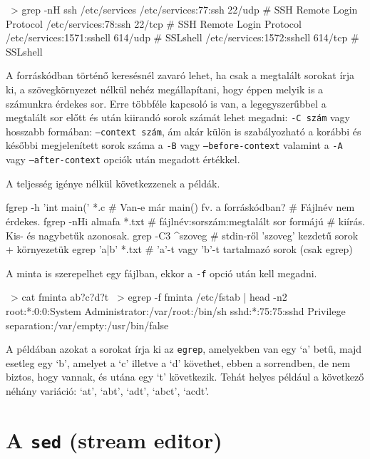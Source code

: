 \begin{VerbExample}
~>  grep -nH ssh /etc/services
/etc/services:77:ssh              22/udp     # SSH Remote Login Protocol
/etc/services:78:ssh              22/tcp     # SSH Remote Login Protocol
/etc/services:1571:sshell       614/udp     # SSLshell
/etc/services:1572:sshell               614/tcp     # SSLshell
\end{VerbExample}

A forráskódban történő keresésnél zavaró lehet, ha csak a megtalált sorokat írja
ki, a szövegkörnyezet nélkül nehéz megállapítani, hogy éppen melyik is a
számunkra érdekes sor. Erre többféle kapcsoló is van, a legegyszerűbbel a
megtalált sor előtt és után kiirandó sorok számát lehet megadni:
\texttt{-C szám} vagy hosszabb formában: \texttt{--context szám}, ám akár külön
is szabályozható a korábbi és későbbi megjelenített sorok száma a \texttt{-B}
vagy \texttt{--before-context} valamint a \texttt{-A} vagy
\texttt{--after-context} opciók után megadott értékkel.

A teljesség igénye nélkül következzenek a példák.

\begin{VerbExample}
fgrep -h 'int main('  *.c     # Van-e már main() fv. a forráskódban?
                              # Fájlnév nem érdekes.
fgrep -nHi almafa *.txt       # fájlnév:sorszám:megtalált sor formájú
                              # kiírás. Kis- és nagybetűk azonosak.
grep -C3 ^szoveg    # stdin-ről 'szoveg' kezdetű sorok + környezetük
egrep 'a|b' *.txt   # 'a'-t vagy 'b'-t tartalmazó sorok (csak egrep)
\end{VerbExample}

A minta is szerepelhet egy fájlban, ekkor a \texttt{-f} opció után kell megadni.

\begin{VerbExample}
~>  cat fminta
ab?c?d?t
~> egrep -f fminta /etc/fstab | head -n2
root:*:0:0:System Administrator:/var/root:/bin/sh
sshd:*:75:75:sshd Privilege separation:/var/empty:/usr/bin/false
\end{VerbExample}

A példában azokat a sorokat írja ki az \texttt{egrep}, amelyekben van egy `a'
betű, majd esetleg egy `b', amelyet a `c' illetve a `d' követhet, ebben a sorrendben,
de nem biztos, hogy vannak, és utána egy `t' következik. Tehát helyes például a
következő néhány variáció: `at', `abt', `adt', `abct', `acdt'.

\section{A \texttt{sed} (stream editor)}
\label{sec:filters-sed}

